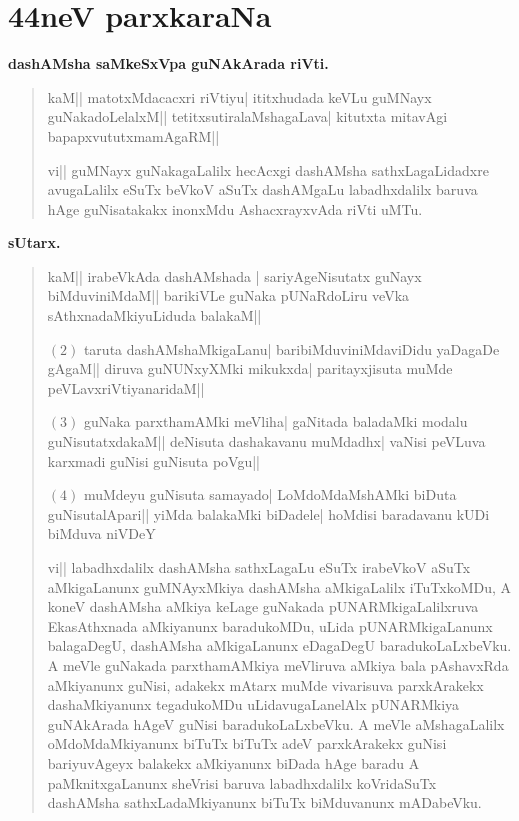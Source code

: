 \chapter{44neV parxkaraNa}

\begin{center}
{\large\bf dashAMsha saMkeSxVpa guNAkArada riVti.}
\end{center}

\begin{verse}
kaM|| matotxMdacacxri riVtiyu| ititxhudada keVLu guMNayx guNakadoLelalxM|| tetitxsutiralaMshagaLava| kitutxta mitavAgi bapapxvututxmamAgaRM||

vi|| guMNayx guNakagaLalilx hecAcxgi dashAMsha sathxLagaLidadxre avugaLalilx eSuTx beVkoV aSuTx dashAMgaLu labadhxdalilx baruva hAge guNisatakakx inonxMdu AshacxrayxvAda riVti uMTu.
\end{verse}

\begin{center}
{\bf\large sUtarx.}
\end{center}

\begin{verse}
kaM|| irabeVkAda dashAMshada | sariyAgeNisutatx guNayx biMduviniMdaM||
barikiVLe guNaka pUNaRdoLiru veVka sAthxnadaMkiyuLiduda balakaM||

$(2)$ taruta dashAMshaMkigaLanu| baribiMduviniMdaviDidu yaDagaDe gAgaM|| diruva guNUNxyXMki mikukxda| paritayxjisuta muMde peVLavxriVtiyanaridaM||

$(3)$ guNaka parxthamAMki meVliha| gaNitada baladaMki modalu guNisutatxdakaM|| deNisuta dashakavanu muMdadhx| vaNisi peVLuva karxmadi guNisi guNisuta poVgu||

$(4)$ muMdeyu guNisuta samayado| LoMdoMdaMshAMki biDuta guNisutalApari|| yiMda bala\-kaMki biDadele| hoMdisi baradavanu kUDi biMduva niVDeY

vi|| labadhxdalilx dashAMsha sathxLagaLu eSuTx irabeVkoV aSuTx aMkigaLanunx guMNAyxMkiya dashAMsha aMkigaLalilx iTuTxkoMDu, A koneV dashAMsha aMkiya keLage guNakada pUNARMkigaLalilxruva EkasAthxnada aMkiyanunx baradukoMDu, uLida pUNARMkigaLanunx balagaDegU, dashAMsha aMkigaLanunx eDagaDegU baradukoLaLxbeVku. A meVle guNakada parxthamAMkiya meVliruva aMkiya bala pAshavxRda aMkiyanunx guNisi, adakekx mAtarx muMde vivarisuva parxkArakekx dashaMkiyanunx tegadukoMDu uLidavugaLanelAlx pUNARMkiya guNAkArada hAgeV guNisi baradukoLaLxbeVku. A meVle aMshagaLalilx oMdoMdaMkiyanunx biTuTx biTuTx adeV parxkArakekx guNisi bariyuvAgeyx balakekx aMki\-yanunx biDada hAge baradu A paMknitxgaLanunx sheVrisi baruva labadhxdalilx koVridaSuTx dashAMsha sathxLadaMki\-yanunx biTuTx biMduvanunx mADabeVku.
\end{verse}

